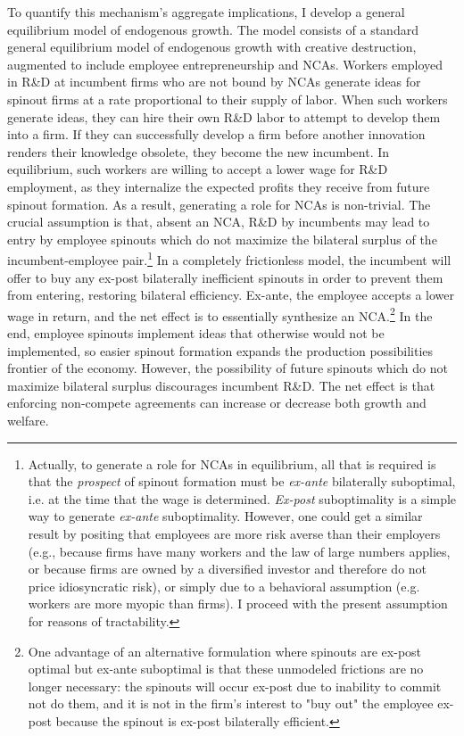 \documentclass[12pt,english]{article}
\theoremstyle{remark}
\begin{document}
To quantify this mechanism's aggregate implications, I develop a general equilibrium model of endogenous growth. The model consists of a standard general equilibrium model of endogenous growth with creative destruction, augmented to include employee entrepreneurship and NCAs. Workers employed in R\&D at incumbent firms who are not bound by NCAs generate ideas for spinout firms at a rate proportional to their supply of labor. When such workers generate ideas, they can hire their own R\&D labor to attempt to develop them into a firm. If they can successfully develop a firm before another innovation renders their knowledge obsolete, they become the new incumbent. In equilibrium, such workers are willing to accept a lower wage for R\&D employment, as they internalize the expected profits they receive from future spinout formation. As a result, generating a role for NCAs is non-trivial. The crucial assumption is that, absent an NCA, R\&D by incumbents may lead to entry by employee spinouts which do not maximize the bilateral surplus of the incumbent-employee pair.\footnote{Actually, to generate a role for NCAs in equilibrium, all that is required is that the \textit{prospect} of spinout formation must be \textit{ex-ante} bilaterally suboptimal, i.e. at the time that the wage is determined. \textit{Ex-post} suboptimality is a simple way to generate \textit{ex-ante} suboptimality. However, one could get a similar result by positing that employees are more risk averse than their employers (e.g., because firms have many workers and the law of large numbers applies, or because firms are owned by a diversified investor and therefore do not price idiosyncratic risk), or simply due to a behavioral assumption (e.g. workers are more myopic than firms). I proceed with the present assumption for reasons of tractability.} In a completely frictionless model, the incumbent will offer to buy any ex-post bilaterally inefficient spinouts in order to prevent them from entering, restoring bilateral efficiency. Ex-ante, the employee accepts a lower wage in return, and the net effect is to essentially synthesize an NCA.\footnote{One advantage of an alternative formulation where spinouts are ex-post optimal but ex-ante suboptimal is that these unmodeled frictions are no longer necessary: the spinouts will occur ex-post due to inability to commit not do them, and it is not in the firm's interest to "buy out" the employee ex-post because the spinout is ex-post bilaterally efficient.} In the end, employee spinouts implement ideas that otherwise would not be implemented, so easier spinout formation expands the production possibilities frontier of the economy. However, the possibility of future spinouts which do not maximize bilateral surplus discourages incumbent R\&D. The net effect is that enforcing non-compete agreements can increase or decrease both growth and welfare. 
\end{document}
